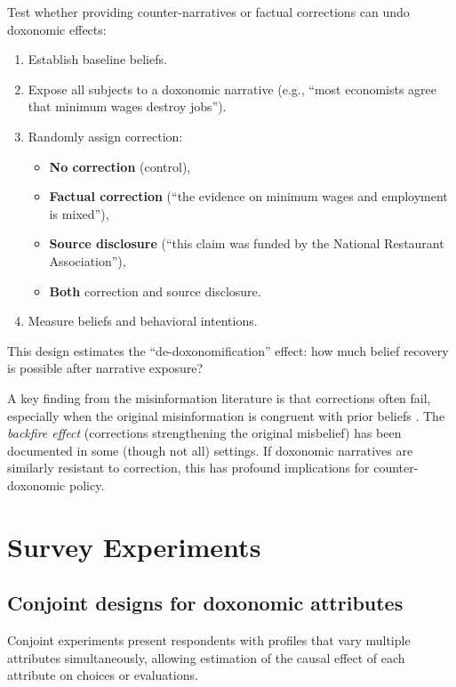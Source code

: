 \begin{model}
\label{mod:correction}
Test whether providing counter-narratives or factual corrections can undo doxonomic effects:
\begin{enumerate}[nosep]
  \item Establish baseline beliefs.
  \item Expose all subjects to a doxonomic narrative (e.g., ``most economists agree that minimum wages destroy jobs'').
  \item Randomly assign correction:
  \begin{itemize}[nosep]
    \item \textbf{No correction} (control),
    \item \textbf{Factual correction} (``the evidence on minimum wages and employment is mixed''),
    \item \textbf{Source disclosure} (``this claim was funded by the National Restaurant Association''),
    \item \textbf{Both} correction and source disclosure.
  \end{itemize}
  \item Measure beliefs and behavioral intentions.
\end{enumerate}
This design estimates the ``de-doxonomification'' effect: how much belief recovery is possible after narrative exposure?
\end{model}

A key finding from the misinformation literature is that corrections often fail, especially when the original misinformation is congruent with prior beliefs \autocite{nyhan2010}.
The \emph{backfire effect} (corrections strengthening the original misbelief) has been documented in some (though not all) settings.
If doxonomic narratives are similarly resistant to correction, this has profound implications for counter-doxonomic policy.

\section{Survey Experiments}
\label{sec:ch19-survey}

\subsection{Conjoint designs for doxonomic attributes}

Conjoint experiments present respondents with profiles that vary multiple attributes simultaneously, allowing estimation of the causal effect of each attribute on choices or evaluations.

